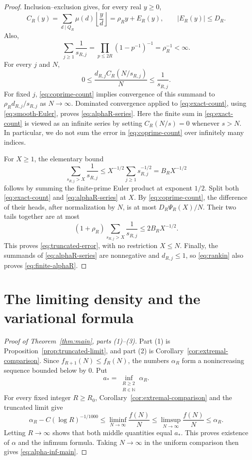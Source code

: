 \documentclass[11pt]{article}
\theoremstyle{definition}
\theoremstyle{remark}
\numberwithin{equation}{section}
\newcommand{\N}{\mathbb N}
\begin{document}
\begin{proof}
Inclusion--exclusion gives, for every real \(y\ge0\),
\begin{equation}\label{eq:coprime-count}
 C_R(y)=\sum_{d\mid Q_R}\mu(d)\left\lfloor\frac yd\right\rfloor
       =\rho_Ry+E_R(y),\qquad |E_R(y)|\le D_R.
\end{equation}
Also,
\begin{equation}\label{eq:smooth-Euler}
 \sum_{j\ge1}\frac1{s_{R,j}}
 =\prod_{p\le2R}(1-p^{-1})^{-1}
 =\rho_R^{-1}<\infty.
\end{equation}
For every \(j\) and \(N\),
\[
 0\le\frac{d_{R,j}C_R(N/s_{R,j})}{N}
 \le\frac1{s_{R,j}}.
\]
For fixed \(j\), \eqref{eq:coprime-count} implies convergence of
this summand to \(\rho_Rd_{R,j}/s_{R,j}\) as \(N\to\infty\).
Dominated convergence applied to \eqref{eq:exact-count}, using
\eqref{eq:smooth-Euler}, proves \eqref{eq:alphaR-series}.
Here the finite sum in \eqref{eq:exact-count} is viewed as an infinite
series by setting \(C_R(N/s)=0\) whenever \(s>N\).
In particular, we do not sum the error in
\eqref{eq:coprime-count} over infinitely many indices.

For \(X\ge1\), the elementary bound
\begin{equation}\label{eq:rankin}
 \sum_{s_{R,j}>X}\frac1{s_{R,j}}
 \le X^{-1/2}\sum_{j\ge1}s_{R,j}^{-1/2}
 =B_RX^{-1/2}
\end{equation}
follows by summing the finite-prime Euler product at exponent
\(1/2\). Split both \eqref{eq:exact-count} and
\eqref{eq:alphaR-series} at \(X\). By
\eqref{eq:coprime-count}, the difference of their heads, after
normalization by \(N\), is at most \(D_R\Psi_R(X)/N\).
Their two tails together are at most
\[
 (1+\rho_R)\sum_{s_{R,j}>X}\frac1{s_{R,j}}
 \le2B_RX^{-1/2}.
\]
This proves \eqref{eq:truncated-error}, with no restriction
\(X\le N\). Finally, the summands of
\eqref{eq:alphaR-series} are nonnegative and \(d_{R,j}\le1\),
so \eqref{eq:rankin} also proves \eqref{eq:finite-alphaR}.
\end{proof}

\section{The limiting density and the variational formula}

\begin{proof}[Proof of Theorem~\ref{thm:main}, parts (1)--(3)]
Part (1) is Proposition~\ref{prop:truncated-limit}, and part (2)
is Corollary~\ref{cor:extremal-comparison}.
Since \(f_{R+1}(N)\le f_R(N)\), the numbers \(\alpha_R\) form a
nonincreasing sequence bounded below by \(0\). Put
\[
 a_*=\inf_{\substack{R\ge2\\R\in\N}}\alpha_R.
\]
For every fixed integer \(R\ge R_0\),
Corollary~\ref{cor:extremal-comparison} and the truncated limit
give
\[
 \alpha_R-C(\log R)^{-1/1000}
 \le\liminf_{N\to\infty}\frac{f(N)}N
 \le\limsup_{N\to\infty}\frac{f(N)}N
 \le\alpha_R.
\]
Letting \(R\to\infty\) shows that both middle quantities equal
\(a_*\). This proves existence of \(\alpha\) and the infimum
formula. Taking \(N\to\infty\) in the uniform comparison then
gives \eqref{eq:alpha-inf-main}.
\end{proof}
\end{document}
